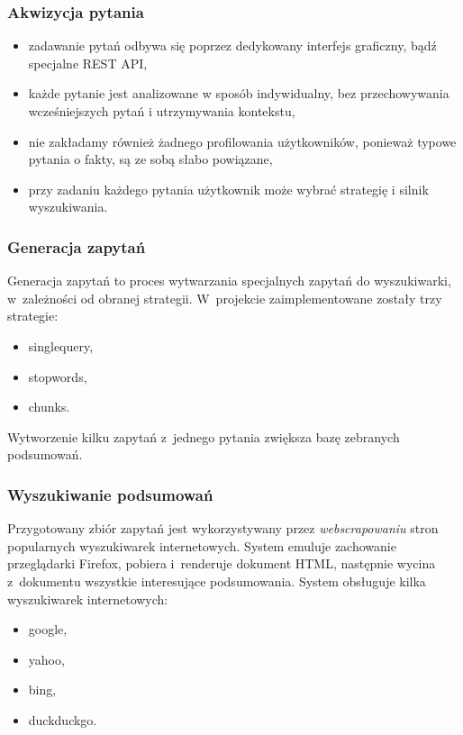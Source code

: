 \documentclass{beamer}
\begin{document}
\begin{frame}
  \frametitle{Akwizycja pytania}
    \begin{itemize}
      \item zadawanie pytań odbywa się poprzez dedykowany interfejs graficzny, bądź specjalne REST API,
      \item każde pytanie jest analizowane w sposób indywidualny, bez przechowywania wcześniejszych pytań i utrzymywania kontekstu,
      \item nie zakładamy również żadnego profilowania użytkowników, ponieważ typowe pytania o fakty, są ze sobą słabo powiązane,
      \item przy zadaniu każdego pytania użytkownik może wybrać strategię i silnik wyszukiwania.
    \end{itemize}
\end{frame}

\begin{frame}
  \frametitle{Generacja zapytań}
  Generacja zapytań to proces wytwarzania specjalnych zapytań do wyszukiwarki, w~zależności od obranej strategii. W~projekcie zaimplementowane zostały trzy strategie:
  \begin{itemize}
    \item singlequery,
    \item stopwords,
    \item chunks.
  \end{itemize}
  Wytworzenie kilku zapytań z~jednego pytania zwiększa bazę zebranych podsumowań.
\end{frame}

\begin{frame}
  \frametitle{Wyszukiwanie podsumowań}
  Przygotowany zbiór zapytań jest wykorzystywany przez \textit{webscrapowaniu} stron popularnych wyszukiwarek internetowych. System emuluje zachowanie przeglądarki Firefox, pobiera i~renderuje dokument HTML, następnie wycina z~dokumentu wszystkie interesujące podsumowania.
  System obsługuje kilka wyszukiwarek internetowych:
  \begin{itemize}
    \item google,
    \item yahoo,
    \item bing,
    \item duckduckgo.
  \end{itemize}
\end{frame}
\end{document}
